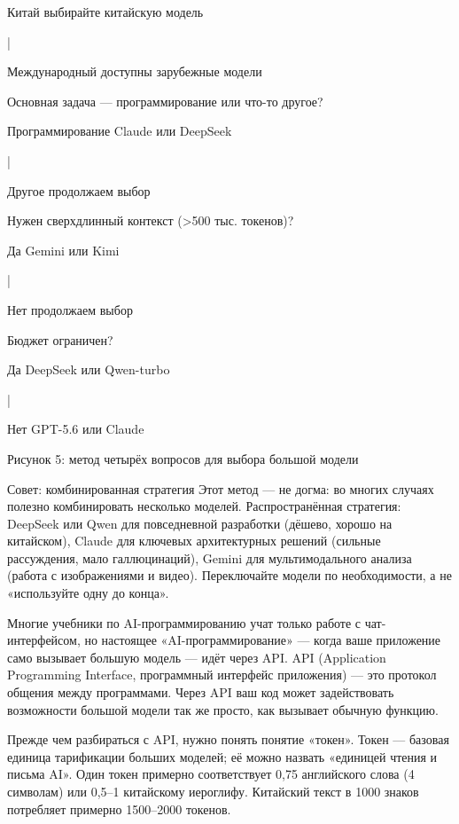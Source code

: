 Китай выбирайте китайскую модель

|

Международный доступны зарубежные модели

Основная задача — программирование или что-то другое?

Программирование Claude или DeepSeek

|

Другое продолжаем выбор

Нужен сверхдлинный контекст (>500 тыс. токенов)?

Да Gemini или Kimi

|

Нет продолжаем выбор

Бюджет ограничен?

Да DeepSeek или Qwen-turbo

|

Нет GPT-5.6 или Claude

\begin{center}\small\color{gray}Рисунок 5: метод четырёх вопросов для выбора большой модели\end{center}

\begin{tcbinfo}{Совет: комбинированная стратегия}
Этот метод — не догма: во многих случаях полезно комбинировать несколько моделей. Распространённая стратегия: DeepSeek или Qwen для повседневной разработки (дёшево, хорошо на китайском), Claude для ключевых архитектурных решений (сильные рассуждения, мало галлюцинаций), Gemini для мультимодального анализа (работа с изображениями и видео). Переключайте модели по необходимости, а не «используйте одну до конца».

\end{tcbinfo}


Многие учебники по AI-программированию учат только работе с чат-интерфейсом, но настоящее «AI-программирование» — когда ваше приложение само вызывает большую модель — идёт через API. API (Application Programming Interface, программный интерфейс приложения) — это протокол общения между программами. Через API ваш код может задействовать возможности большой модели так же просто, как вызывает обычную функцию.


Прежде чем разбираться с API, нужно понять понятие «токен». Токен — базовая единица тарификации больших моделей; её можно назвать «единицей чтения и письма AI». Один токен примерно соответствует 0,75 английского слова (4 символам) или 0,5–1 китайскому иероглифу. Китайский текст в 1000 знаков потребляет примерно 1500–2000 токенов.

